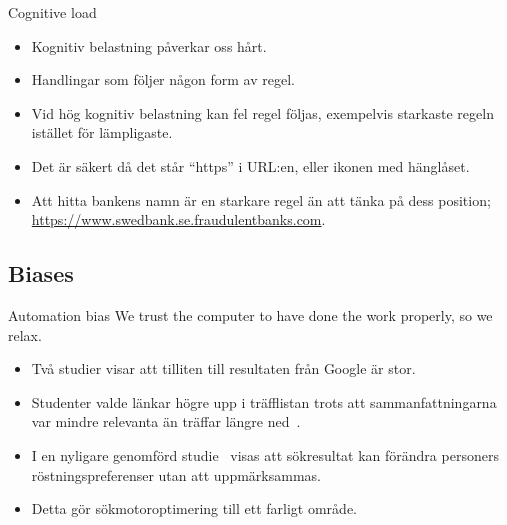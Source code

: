 \documentclass{beamer}
\begin{document}
\begin{frame}
  \begin{block}{Cognitive load}
    \begin{itemize}
      \item Kognitiv belastning påverkar oss hårt.
      \item Handlingar som följer någon form av regel.
      \item Vid hög kognitiv belastning kan fel regel följas, exempelvis 
        starkaste regeln istället för lämpligaste.
    \end{itemize}
  \end{block}
  
  \pause{}

  \begin{example}
    \begin{itemize}
      \item Det är säkert då det står \enquote{https} i URL:en, eller ikonen 
        med hänglåset.
      \item Att hitta bankens namn är en starkare regel än att tänka på dess 
        position; \url{https://www.swedbank.se.fraudulentbanks.com}.
    \end{itemize}
  \end{example}
\end{frame}

\subsection{Biases}

\begin{frame}
  \begin{block}{Automation bias}
    We trust the computer to have done the work properly, so we relax.
  \end{block}
  \begin{example}
    \begin{itemize}
      \item Två studier visar att tilliten till resultaten från Google är stor.

      \item Studenter valde länkar högre upp i träfflistan trots att 
        sammanfattningarna var mindre relevanta än träffar längre 
        ned~\cite{Pan2007igw}.

      \item I en nyligare genomförd studie~\cite{Epstein2013dar} visas att 
        sökresultat kan förändra personers röstningspreferenser utan att 
        uppmärksammas.

      \item Detta gör sökmotoroptimering till ett farligt område.

    \end{itemize}
  \end{example}
\end{frame}
\end{document}
